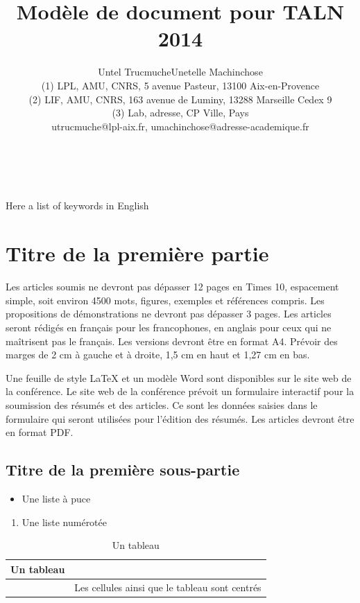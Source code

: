\documentclass[10pt,a4paper,twoside]{article}
\title{Modèle de document pour TALN 2014}
\author{Untel Trucmuche\up{1, 2}\quad Unetelle Machinchose\up{1, 3}\\
  (1) LPL, AMU, CNRS, 5 avenue Pasteur, 13100 Aix-en-Provence \\ 
  (2) LIF, AMU, CNRS, 163 avenue de Luminy, 13288 Marseille Cedex 9\\ 
  (3) Lab, adresse, CP Ville, Pays \\ 
  utrucmuche@lpl-aix.fr, umachinchose@adresse-academique.fr \\ 
}
\begin{document}
\maketitle


\\

\\

{Here a list of keywords in English}


\section{Titre de la première partie}

Les articles soumis ne devront pas dépasser 12 pages en Times 10, espacement simple, soit environ 4500 mots, figures, exemples et références compris. Les propositions de démonstrations ne devront pas dépasser 3 pages. Les articles seront rédigés en français pour les francophones, en anglais pour ceux qui ne maîtrisent pas le français. Les versions devront être en format A4. Prévoir des marges de 2 cm à gauche et à droite, 1,5 cm en haut et 1,27 cm en bas.

Une feuille de style LaTeX et un modèle Word sont disponibles sur le site web de la conférence. Le site web de la conférence prévoit un formulaire interactif pour la soumission des résumés et des articles. Ce sont les données saisies dans le formulaire qui seront utilisées pour l'édition des résumés. Les articles devront être en format PDF. 


\subsection{Titre de la première sous-partie}
\begin{itemize}
\item Une liste à puce 
\end{itemize}
\begin{enumerate}
\item Une liste numérotée
\end{enumerate}

\begin{table}[!h]
\centering
	\begin{tabular}{|c|p{4cm}|}
	\hline
	Un tableau&\\
	\hline
	&Les cellules ainsi que le tableau sont centrés\\
	\hline
	\end{tabular}
\caption{Un tableau}
\end{table}
\end{document}
